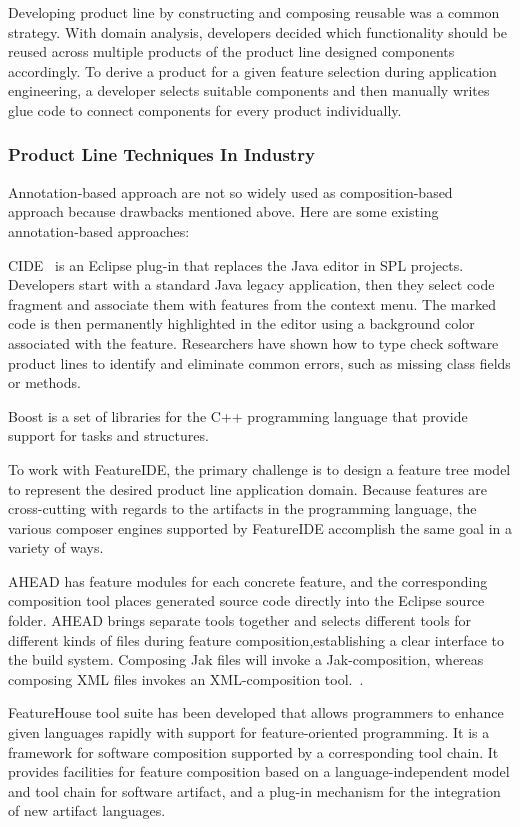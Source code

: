 Developing product line by constructing and composing reusable was a
common strategy. With domain analysis, developers decided which
functionality should be reused across multiple products of the product
line designed components accordingly. To derive a product for a given
feature selection during application engineering, a developer selects
suitable components and then manually writes glue code to connect
components for every product individually.



\subsubsection{Product Line Techniques In Industry}

Annotation-based approach are not so widely used as composition-based
approach because drawbacks mentioned above. Here are some existing
annotation-based approaches:

CIDE~\cite{CIDE:Eclipse} is an Eclipse plug-in that
replaces the Java editor in SPL projects. Developers start with a
standard Java legacy application, then they select code fragment and
associate them with features from the context menu. The marked code is
then permanently highlighted in the editor using a background color
associated with the feature. Researchers have shown how to type check
software product lines to identify and eliminate common errors, such as
missing class fields or methods.

Boost is a set of libraries for the C++ programming language that provide support for
tasks and structures.


To work with FeatureIDE, the primary challenge is to design a feature
tree model to represent the desired product line application domain.
Because features are cross-cutting with regards to the artifacts in the
programming language, the various composer engines supported by
FeatureIDE accomplish the same goal in a variety of ways.

AHEAD has feature modules for each concrete feature, and the
corresponding composition tool places generated source code directly
into the Eclipse source folder. AHEAD brings separate tools together and
selects different tools for different kinds of files during feature
composition,establishing a clear interface to the build system.
Composing Jak files will invoke a Jak-composition, whereas composing XML
files invokes an XML-composition
tool.~\cite{Batory2004FeatureorientedPA}.

FeatureHouse tool suite has been developed that allows programmers to
enhance given languages rapidly with support for feature-oriented
programming. It is a framework for software composition supported by a
corresponding tool chain. It provides facilities for feature composition
based on a language-independent model and tool chain for software
artifact, and a plug-in mechanism for the integration of new artifact
languages.~\cite{Apel:2009:FLA:1555001.1555038}

